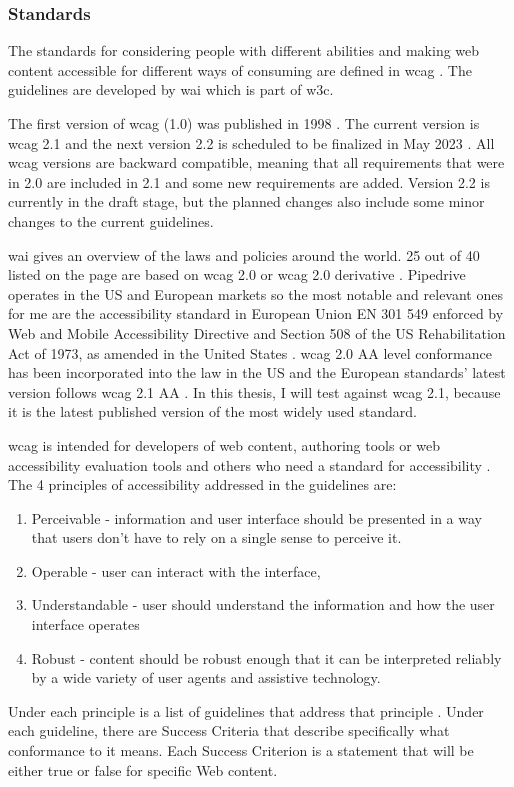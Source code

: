 \documentclass{master_thesis}
\begin{document}
\subsubsection{Standards}

The standards for considering people with different abilities and making web content accessible for different ways of consuming are defined in \ac{wcag} \citep{Kirkpatrick2018}. The guidelines are developed by \ac{wai} which is part of \ac{w3c}.

The first version of \ac{wcag} (1.0) was published in 1998 \citep{Vanderheiden1998}. The current version is \ac{wcag} 2.1 and the next version 2.2 is scheduled to be finalized in May 2023 \citep{Henry2023}. All \ac{wcag} versions are backward compatible, meaning that all requirements that were in 2.0 are included in 2.1 and some new requirements are added. Version 2.2 is currently in the draft stage, but the planned changes also include some minor changes to the current guidelines.

\ac{wai} gives an overview of the laws and policies around the world. 25 out of 40 listed on the page are based on \ac{wcag} 2.0 or \ac{wcag} 2.0 derivative \citep{Mueller2018}. Pipedrive operates in the US and European markets so the most notable and relevant ones for me are the accessibility standard in European Union EN 301 549 enforced by Web and Mobile Accessibility Directive \citep{MuellerEU2017} and Section 508 of the US Rehabilitation Act of 1973, as amended in the United States \citep{MuellerUS2017}. \ac{wcag} 2.0 AA level conformance has been incorporated into the law in the US and the European standards' latest version follows \ac{wcag} 2.1 AA \citep{LevelAccess2021}. In this thesis, I will test against \ac{wcag} 2.1, because it is the latest published version of the most widely used standard.


\ac{wcag} is intended for developers of web content, authoring tools or web accessibility evaluation tools and others who need a standard for accessibility \citep{Henry2023}. The 4 principles of accessibility addressed in the guidelines are:
\begin{enumerate}
	\item Perceivable - information and user interface should be presented in a way that users don't have to rely on a single sense to perceive it.
	\item Operable - user can interact with the interface,
	\item Understandable - user should understand the information and how the user interface operates
	\item Robust - content should be robust enough that it can be interpreted reliably by a wide variety of user agents and assistive technology.
\end{enumerate}
Under each principle is a list of guidelines that address that principle \citep{AGWGWP2022}. Under each guideline, there are Success Criteria that describe specifically what conformance to it means. Each Success Criterion is a statement that will be either true or false for specific Web content.
\end{document}
